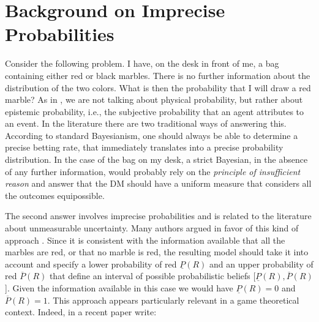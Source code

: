 \documentclass[fleqn,reqno,12pt]{article}
\theoremstyle{Satz}
\theoremstyle{Bsp}
\begin{document}


\newpage

\appendix

\iffalse
\section{Background on Imprecise Probabilities}
\label{sec:impr-prob-beli}

Consider the following problem. I have, on the desk in front of me, a bag containing either red
or black marbles. There is no further information about the distribution of the two
colors. What is then the probability that I will draw a red marble? As in \citet{walley96}, we
are not talking about physical probability, but rather about epistemic probability, i.e., the
subjective probability that an agent attributes to an event.  In the literature there are two
traditional ways of answering this. According to standard Bayesianism, one should always be
able to determine a precise betting rate, that immediately translates into a precise
probability distribution. In the case
of the bag on my desk, a strict Bayesian, in the absence of any further information, would
probably rely on the \textit{principle of insufficient reason} and answer that the DM should
have a uniform measure that considers all the outcomes equipossible.


The second answer involves imprecise probabilities and is related to the literature about
unmeasurable uncertainty. Many authors argued in favor of this kind of approach
\citep[e.g.,][]{levi74,gardsah82,walley96}. Since it is consistent with the information
available that all the marbles are red, or that no marble is red, the resulting model should
take it into account and specify a lower probability of red $\underline{P}(R)$ and an upper
probability of red $\overline{P}(R)$ that define an interval of possible probabilistic beliefs
[$\underline{P}(R), \overline{P}(R)$]. Given the information available in this case we would
have $\underline{P}(R)=0$ and $\overline{P}(R)=1$. This approach appears particularly relevant
in a game theoretical context. Indeed, in a recent paper \citet{BattCerrMM15} write:
\end{document}
